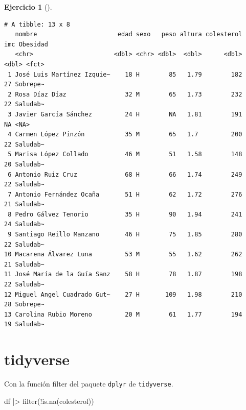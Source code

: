 \documentclass[
  a4paper,
]{scrreport}
\newenvironment{Shaded}{\begin{snugshade}}{\end{snugshade}}
\newcommand{\FunctionTok}[1]{\textcolor[rgb]{0.28,0.35,0.67}{#1}}
\newcommand{\NormalTok}[1]{\textcolor[rgb]{0.00,0.23,0.31}{#1}}
\newcommand{\SpecialCharTok}[1]{\textcolor[rgb]{0.37,0.37,0.37}{#1}}
\theoremstyle{definition}
\newtheorem{exercise}{Ejercicio}[chapter]
\theoremstyle{remark}
\begin{document}
\begin{exercise}[]
\begin{enumerate}
\begin{tcolorbox}
\begin{Shaded}
\end{Shaded}

\begin{verbatim}
# A tibble: 13 x 8
   nombre                      edad sexo   peso altura colesterol   imc Obesidad
   <chr>                      <dbl> <chr> <dbl>  <dbl>      <dbl> <dbl> <fct>   
 1 José Luis Martínez Izquie~    18 H        85   1.79        182    27 Sobrepe~
 2 Rosa Díaz Díaz                32 M        65   1.73        232    22 Saludab~
 3 Javier García Sánchez         24 H        NA   1.81        191    NA <NA>    
 4 Carmen López Pinzón           35 M        65   1.7         200    22 Saludab~
 5 Marisa López Collado          46 M        51   1.58        148    20 Saludab~
 6 Antonio Ruiz Cruz             68 H        66   1.74        249    22 Saludab~
 7 Antonio Fernández Ocaña       51 H        62   1.72        276    21 Saludab~
 8 Pedro Gálvez Tenorio          35 H        90   1.94        241    24 Saludab~
 9 Santiago Reillo Manzano       46 H        75   1.85        280    22 Saludab~
10 Macarena Álvarez Luna         53 M        55   1.62        262    21 Saludab~
11 José María de la Guía Sanz    58 H        78   1.87        198    22 Saludab~
12 Miguel Angel Cuadrado Gut~    27 H       109   1.98        210    28 Sobrepe~
13 Carolina Rubio Moreno         20 M        61   1.77        194    19 Saludab~
\end{verbatim}

  \section{tidyverse}

  Con la función filter del paquete \texttt{dplyr} de
  \texttt{tidyverse}.

\begin{Shaded}
\begin{Highlighting}[]
\NormalTok{df }\SpecialCharTok{|\textgreater{}} \FunctionTok{filter}\NormalTok{(}\SpecialCharTok{!}\FunctionTok{is.na}\NormalTok{(colesterol))}
\end{Highlighting}
\end{Shaded}


\end{tcolorbox}
\end{enumerate}
\end{exercise}
\end{document}
